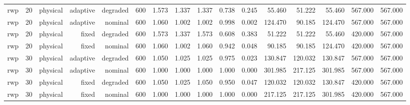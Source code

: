 \begin{tabular}{lrrrrrrrrrrrrrrr}
rwp & 20 & physical & adaptive & degraded & 600 & 1.573 & 1.337 & 1.337 & 0.738 & 0.245 & 55.460 & 51.222 & 55.460 & 567.000 & 567.000 \\
rwp & 20 & physical & adaptive & nominal & 600 & 1.060 & 1.002 & 1.002 & 0.998 & 0.002 & 124.470 & 90.185 & 124.470 & 567.000 & 567.000 \\
rwp & 20 & physical & fixed & degraded & 600 & 1.573 & 1.337 & 1.573 & 0.608 & 0.383 & 51.222 & 51.222 & 55.460 & 420.000 & 567.000 \\
rwp & 20 & physical & fixed & nominal & 600 & 1.060 & 1.002 & 1.060 & 0.942 & 0.048 & 90.185 & 90.185 & 124.470 & 420.000 & 567.000 \\
rwp & 30 & physical & adaptive & degraded & 600 & 1.050 & 1.025 & 1.025 & 0.975 & 0.023 & 130.847 & 120.032 & 130.847 & 567.000 & 567.000 \\
rwp & 30 & physical & adaptive & nominal & 600 & 1.000 & 1.000 & 1.000 & 1.000 & 0.000 & 301.985 & 217.125 & 301.985 & 567.000 & 567.000 \\
rwp & 30 & physical & fixed & degraded & 600 & 1.050 & 1.025 & 1.050 & 0.950 & 0.047 & 120.032 & 120.032 & 130.847 & 420.000 & 567.000 \\
rwp & 30 & physical & fixed & nominal & 600 & 1.000 & 1.000 & 1.000 & 1.000 & 0.000 & 217.125 & 217.125 & 301.985 & 420.000 & 567.000 \\
\bottomrule
\end{tabular}